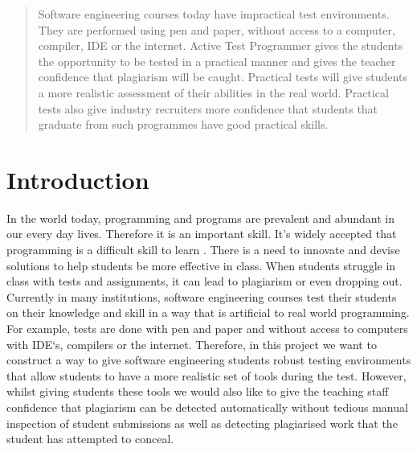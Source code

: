 \documentclass[twocolumn]{article}
\begin{document}



\begin{abstract}

Software engineering courses today have impractical test environments. They are
performed using pen and paper, without access to a computer, compiler, IDE or
the internet. Active Test Programmer gives the students the opportunity to be
tested in a practical manner and gives the teacher confidence that plagiarism
will be caught. Practical tests will give students a more realistic assessment
of their abilities in the real world. Practical tests also give industry
recruiters more confidence that students that graduate from such programmes have
good practical skills. 

\end{abstract}

\section{Introduction}
In the world today, programming and programs are prevalent and abundant in our
every day lives. Therefore it is an important skill. It's
widely accepted that programming is a difficult skill to learn
\cite{jenkins2002difficulty, robins2003learning}. There is a need to innovate
and devise solutions to help students be more effective in class.
When students struggle in class with tests and assignments, it can lead to
plagiarism or even dropping out\cite{bennedsen2007failure}. Currently in many
institutions, software engineering courses test their students on their
knowledge and skill in a way that is artificial to real world programming.
For example, tests are done with pen and paper and without access to computers with
IDE`s, compilers or the internet. Therefore, in this project we want to construct a
way to give software engineering students robust testing environments that allow
students to have a more realistic set of tools during the test. However, whilst
giving students these tools we would also like to give the teaching staff
confidence that plagiarism can be detected automatically without tedious manual
inspection of student submissions as well as detecting plagiarised work that the
student has attempted to conceal.
\end{document}
